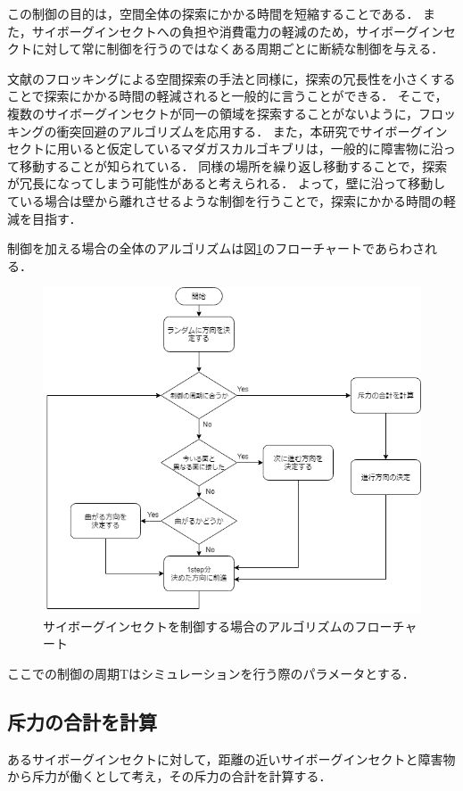 \documentclass[a4paper,11pt]{jarticle}
\begin{document}
	この制御の目的は，空間全体の探索にかかる時間を短縮することである．
	また，サイボーグインセクトへの負担や消費電力の軽減のため，サイボーグインセクトに対して常に制御を行うのではなくある周期ごとに断続な制御を与える．
	
	文献\cite{exploration}のフロッキングによる空間探索の手法と同様に，探索の冗長性を小さくすることで探索にかかる時間の軽減されると一般的に言うことができる．
	そこで，複数のサイボーグインセクトが同一の領域を探索することがないように，フロッキングの衝突回避のアルゴリズムを応用する．
	また，本研究でサイボーグインセクトに用いると仮定しているマダガスカルゴキブリは，一般的に障害物に沿って移動することが知られている．
	同様の場所を繰り返し移動することで，探索が冗長になってしまう可能性があると考えられる．
	よって，壁に沿って移動している場合は壁から離れさせるような制御を行うことで，探索にかかる時間の軽減を目指す．
	
	制御を加える場合の全体のアルゴリズムは図\ref{fig:control}のフローチャートであらわされる．
	
	\begin{figure}
		\centering
		\includegraphics[width=0.8\linewidth]{png/control.png}
		\caption[アルゴリズムのフローチャート]{サイボーグインセクトを制御する場合のアルゴリズムのフローチャート}
		\label{fig:control}
	\end{figure}
	ここでの制御の周期Tはシミュレーションを行う際のパラメータとする．
	
	\subsection{斥力の合計を計算}
	\label{sec:repulsive}
	あるサイボーグインセクトに対して，距離の近いサイボーグインセクトと障害物から斥力が働くとして考え，その斥力の合計を計算する\cite{flocking-robot}．
	
\end{document}
